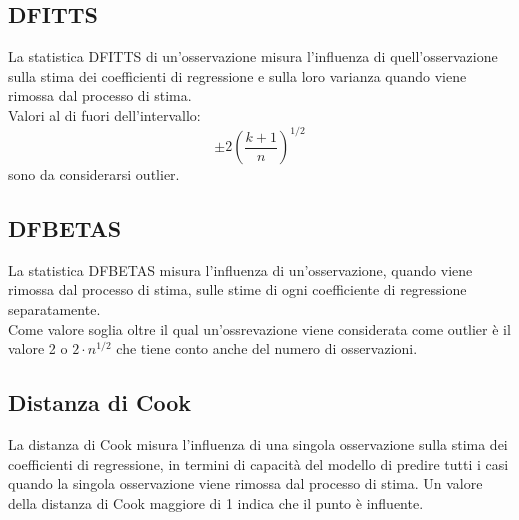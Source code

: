 \subsection{DFITTS}
La statistica DFITTS di un'osservazione misura l’influenza di quell'osservazione sulla stima dei coefficienti di regressione e sulla loro varianza quando viene rimossa dal processo di stima.\\
Valori al di fuori dell'intervallo:
\begin{equation}
\pm 2 (\frac{k+1}{n})^{1/2} 
\end{equation}
sono da considerarsi outlier.
\subsection{DFBETAS}
La statistica DFBETAS misura l’influenza di un'osservazione, quando viene rimossa dal processo di stima, sulle stime di ogni coefficiente di regressione separatamente.\\
Come valore soglia oltre il qual un'ossrevazione viene considerata come outlier è il valore 2 o $2 \cdot n^{1/2}$ che tiene conto anche del numero di osservazioni.

\subsection{Distanza di Cook}
La distanza di Cook misura l’influenza di una singola osservazione sulla stima dei coefficienti di regressione, in termini di capacità del modello di predire tutti i casi quando la singola osservazione viene rimossa dal processo di stima. Un valore della distanza di Cook maggiore di 1 indica che il punto è influente.


